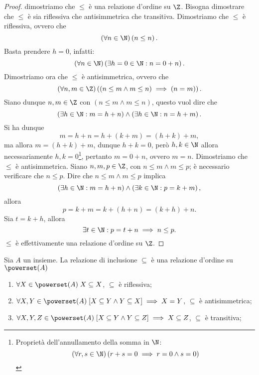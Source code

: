 \begin{proof}
    dimostriamo che \(\leq\) è una relazione d'ordine su \(\Z\). Bisogna dimostrare che \(\leq\) è sia riflessiva che antisimmetrica che transitiva. Dimostriamo che \(\leq\) è riflessiva, ovvero che
    \[
        (\forall n \in \N) \left(n \leq n\right).
    \]
    Basta prendere \(h = 0\), infatti:
    \[
        (\forall n \in \N) \left(\exists h = 0 \in \N : n = 0 + n\right).
    \]
    Dimostriamo ora che \(\leq\) è antisimmetrica, ovvero che
    \[
        (\forall n,m \in \Z) \left((n \leq m \land m \leq n) \implies (n = m)\right).
    \]
    Siano dunque \(n,m \in \Z\) con \((n \leq m \land m \leq n)\), questo vuol dire che
    \[
        \left(\exists h \in \N : m = h + n\right)
        \land
        \left(\exists h \in \N : n = h + m\right).
    \]
    Si ha dunque
    \[
        m = h + n
          = h + (k + m)
          = (h + k) + m,
    \]
    ma allora \(m = (h + k) + m\), dunque \(h + k = 0\), però \(h,k \in \N\) allora necessariamente \(h,k = 0\)\footnote{%
        Proprietà dell'annullamento della somma in \(\N\):
        \[
            (\forall r,s \in \N) \left(r + s = 0 \implies r = 0 \land s = 0\right)
        \]
    }, pertanto \(m = 0 + n\), ovvero \(m = n\).
    Dimostriamo che \(\leq\) è antisimmetrica. Siano \(n,m,p \in \Z\), con \(n \leq m \land m \leq p\); è necessario verificare che \(n \leq p\). Dire che \(n \leq m \land m \leq p\) implica
    \[
        \left(\exists h \in \N : m = h + n\right)
        \land
        \left(\exists k \in \N : p = k + m\right),
    \]
    allora
    \[
        p = k + m
          = k + (h + n)
          = (k + h) + n.
    \]
    Sia \(t = k + h\), allora
    \[
        \exists t \in \N : p = t + n \implies n \leq p.
    \]
    \(\leq\) è effettivamente una relazione d'ordine su \(\Z\).
\end{proof}

\begin{examples}
    Sia \(A\) un insieme. La relazione di inclusione \(\subseteq\) è una relazione d'ordine su \(\powerset(A)\)
    \begin{enumerate}
        \item \(\forall X     \in \powerset(A)\;  X \subseteq X \), \(\subseteq\) è riflessiva;
        \item \(\forall X,Y   \in \powerset(A)\; [X \subseteq Y \land Y \subseteq X] \implies X = Y \), \(\subseteq\) è antisimmetrica;
        \item \(\forall X,Y,Z \in \powerset(A)\; [X \subseteq Y \land Y \subseteq Z] \implies X \subseteq Z\), \(\subseteq\) è transitiva;
    \end{enumerate}
\end{examples}



